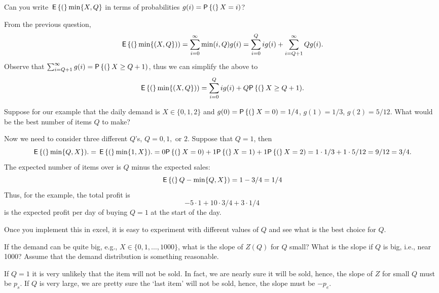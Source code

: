 \begin{question}
  Can you write $\,\mathsf{E}\left\{(\right\}\min\{X,Q\}$ in terms of probabilities $g(i) = \P(X=i)$?
  \begin{solution}
From the previous question,
\begin{equation*}
  \,\mathsf{E}\left\{(\right\}\min\{(X,Q\})) = \sum_{i=0}^\infty \min(i,Q)g(i) = \sum_{i=0}^Q i g(i) + \sum_{i=Q+1}^\infty Q g(i).
\end{equation*}
Observe that $\sum_{i=Q+1}^\infty g(i)=\P(X\geq Q+1)$, thus we can simplify the above to
\begin{equation*}
  \E(\min\{(X,Q\})) = \sum_{i=0}^Q i g(i) + Q\P(X\geq Q+1).
\end{equation*}
  \end{solution}
\end{question}

\begin{question}
  Suppose for our example that the daily demand is $X\in \{0,1,2\}$
  and $g(0) = \P(X=0)=1/4$, $g(1)=1/3$, $g(2)=5/12$. What would be the
  best number of items $Q$ to make?
\begin{solution}
  Now we need to consider three different $Q$'s, $Q=0, 1,$ or $2$.
  Suppose that $Q=1$, then
\begin{equation*}
    \E(\min\{Q,X\}). =   \E(\min\{1,X\}). =   0\P(X=0) + 1\P(X=1)+1\P(X=2) = 1\cdot 1/3+1\cdot 5/12=9/12=3/4.
\end{equation*}
The expected number of items over is $Q$ minus the expected sales: 
  \begin{equation*}
    \,\mathsf{E}\left\{(\right\}Q-\min\{Q,X\}) = 1-3/4=1/4
  \end{equation*}
Thus,  for the example, the total profit is
\begin{equation*}
  -5\cdot1 + 10\cdot3/4+3\cdot1/4
\end{equation*}
is the expected profit per day of buying $Q=1$ at the start of the day. 

Once you implement this in excel, it is easy to experiment with
different values of $Q$ and see what is the best choice for $Q$. 
\end{solution}
\end{question}


\begin{question}
If the demand can be quite big, e.g., $X\in\{0,1,\ldots, 1000\}$, what is the slope of $Z(Q)$ for $Q$ small? What is the slope if $Q$ is big, i.e., near 1000? Assume that the demand distribution is something reasonable.
\begin{solution}
  If $Q=1$ it is very unlikely that the item will not be sold. In fact, we are nearly sure it will be sold, hence, the slope of $Z$ for small $Q$ must be $p_s$. If $Q$ is very large, we are pretty sure the `last item' will not be sold, hence, the slope must be $-p_e$. 
\end{solution}
\end{question}

